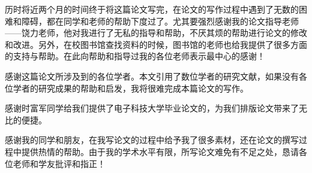 
历时将近两个月的时间终于将这篇论文写完，在论文的写作过程中遇到了无数的困难和障碍，都在同学和老师的帮助下度过了。尤其要强烈感谢我的论文指导老师——饶力老师，他对我进行了无私的指导和帮助，不厌其烦的帮助进行论文的修改和改进。另外，在校图书馆查找资料的时候，图书馆的老师也给我提供了很多方面的支持与帮助。在此向帮助和指导过我的各位老师表示最中心的感谢！

感谢这篇论文所涉及到的各位学者。本文引用了数位学者的研究文献，如果没有各位学者的研究成果的帮助和启发，我将很难完成本篇论文的写作。

感谢时富军同学给我们提供了电子科技大学毕业论文的，为我们排版论文带来了无比的便捷。

感谢我的同学和朋友，在我写论文的过程中给予我了很多素材，还在论文的撰写过程中提供热情的帮助。由于我的学术水平有限，所写论文难免有不足之处，恳请各位老师和学友批评和指正！
